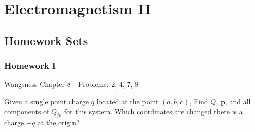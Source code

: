         \chapter{Electromagnetism II}
        \section{Homework Sets}
            \subsection{Homework I}
                Wangsness Chapter 8 - Problems: 2, 4, 7, 8
                \begin{problem}
                    \label{problem:EMAG_II_Wangsness_8_2}
                    Given a single point charge $q$ located at the
                    point $(a,b,c)$, Find $Q$, $\mathbf{p}$, and
                    all components of $Q_{jk}$ for this system.
                    Which coordinates are changed there is a charge
                    $\minus{q}$ at the origin?
                \end{problem}
